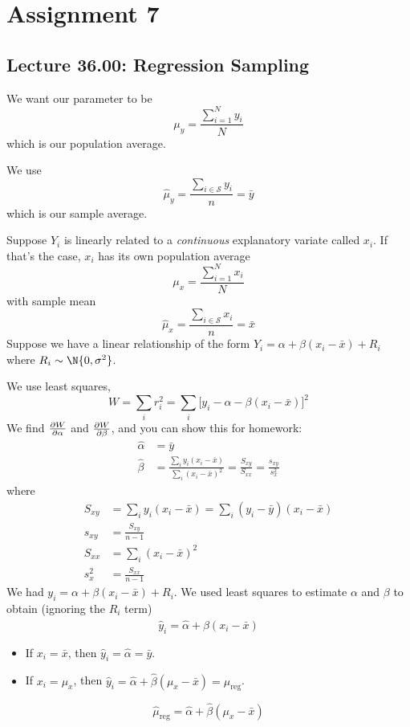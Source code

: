 \chapter{Assignment 7}
\section{Lecture 36.00: Regression Sampling}
We want our parameter to be
\[ \mu_y = \frac{\sum_{i=1}^{N} y_i}{N}  \]
which is our population average.

We use
\[ \hat{\mu}_y=\frac{\sum_{i\in\mathcal{S}}y_i}{n}=\bar{y}  \]
which is our sample average.

Suppose $ Y_i $ is linearly related to a \emph{continuous}
explanatory variate called $ x_i $. If that's the case,
$ x_i $ has its own population average
\[ \mu_x= \frac{\sum_{i=1}^{N} x_i}{N} \]
with sample mean
\[ \hat{\mu}_x=\frac{\sum_{i\in\mathcal{S}} x_i }{n}=\bar{x}  \]
Suppose we have a linear relationship of the form
$ Y_i=\alpha+\beta(x_i-\bar{x})+R_i $ where $ R_i \sim \N{0,\sigma^2} $.

We use least squares,
\[ W=\sum_{i}r_i^2=\sum_{i}\bigl[y_i-\alpha-\beta(x_i-\bar{x})\bigr]^2  \]
We find $\pdv{W}{\alpha}$ and $\pdv{W}{\beta}$, and you can show this for homework:
\begin{align*}
    \hat{\alpha} & =\bar{y}                                                                                                \\
    \hat{\beta}  & =\frac{\sum_{i}y_i(x_i-\bar{x})}{\sum_{i}(x_i-\bar{x})^2 }=\frac{S_{xy}}{S_{xx}}=\frac{s_{xy}}{s_{x}^2}
\end{align*}
where
\begin{align*}
    S_{xy}  & =\sum_{i}y_i(x_i-\bar{x})=\sum_{i}(y_i-\bar{y})(x_i-\bar{x}) \\
    s_{xy}  & =\frac{S_{xy}}{n-1}                                          \\
    S_{xx}  & =\sum_{i}(x_i-\bar{x})^2                                     \\
    s_{x}^2 & =\frac{S_{xx}}{n-1}
\end{align*}
We had $ y_i=\alpha+\beta(x_i-\bar{x})+R_i $. We used least squares
to estimate $ \alpha $ and $ \beta $ to obtain (ignoring the $ R_i $ term)
\[ \hat{y}_i=\hat{\alpha}+\hat{\beta}(x_i-\bar{x}) \]
\begin{itemize}
    \item If $ x_i=\bar{x} $, then $ \hat{y}_i=\hat{\alpha}=\bar{y} $.
    \item If $ x_i=\mu_x $, then $ \hat{y}_i=\hat{\alpha}+\hat{\beta}(\mu_x-\bar{x})=\hat{\mu}_{\text{reg}} $.
\end{itemize}
\[ \boxed{\hat{\mu}_{\text{reg}}=\hat{\alpha}+\hat{\beta}(\mu_x-\bar{x})} \]
